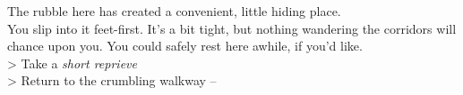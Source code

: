 The rubble here has created a convenient, little hiding place.\\

You slip into it feet-first. It’s a bit tight, but nothing wandering the corridors will chance upon you. You could safely rest here awhile, if you’d like.\\

> Take a \emph{short reprieve}\\
> Return to the crumbling walkway -- 